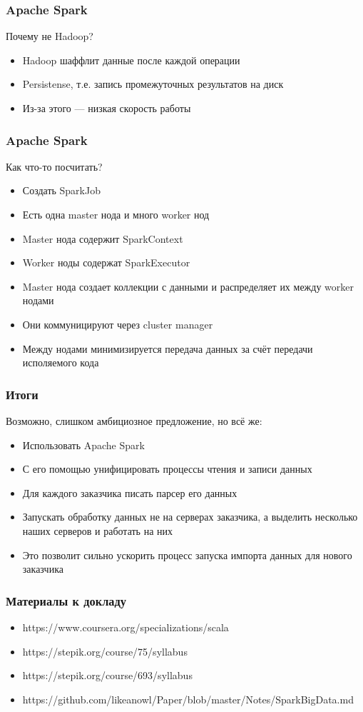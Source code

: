 \documentclass{beamer}
\begin{document}
\begin{frame}\frametitle{Apache Spark}
Почему не Hadoop?
\begin{itemize}
    \item Hadoop шаффлит данные после каждой операции
    \item Persistense, т.е. запись промежуточных результатов на диск
    \item Из-за этого --- низкая скорость работы
\end{itemize}
\end{frame}

\begin{frame}\frametitle{Apache Spark}
Как что-то посчитать?
\begin{itemize}
    \item Создать SparkJob
    \item Есть одна master нода и много worker нод
    \item Master нода содержит SparkContext
    \item Worker ноды содержат SparkExecutor
    \item Master нода создает коллекции с данными и распределяет их между worker нодами
    \item Они коммуницируют через cluster manager
    \item Между нодами минимизируется передача данных за счёт передачи исполяемого кода
\end{itemize}
\end{frame}

\begin{frame}\frametitle{Итоги}
Возможно, слишком амбициозное предложение, но всё же:
\begin{itemize}
    \item Использовать Apache Spark
    \item С его помощью унифицировать процессы чтения и записи данных
    \item Для каждого заказчика писать парсер его данных
    \item Запускать обработку данных не на серверах заказчика, а выделить несколько наших серверов и работать на них
    \item Это позволит сильно ускорить процесс запуска импорта данных для нового заказчика
\end{itemize}
\end{frame}

\begin{frame}\frametitle{Материалы к докладу}
\begin{itemize}
    \item https://www.coursera.org/specializations/scala
    \item https://stepik.org/course/75/syllabus
    \item https://stepik.org/course/693/syllabus
    \item https://github.com/likeanowl/Paper/blob/master/Notes/SparkBigData.md
\end{itemize}
\end{frame}
\end{document}
